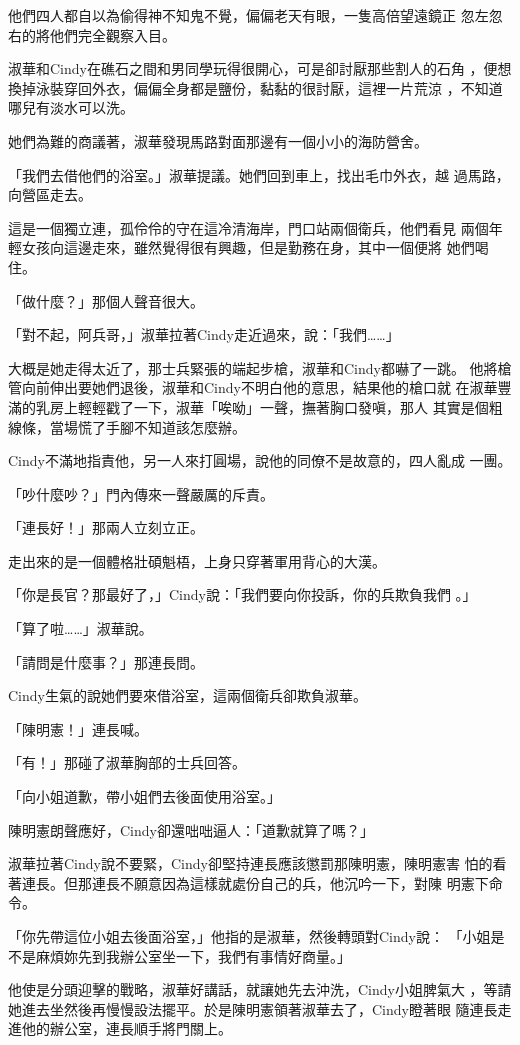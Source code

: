 他們四人都自以為偷得神不知鬼不覺，偏偏老天有眼，一隻高倍望遠鏡正
忽左忽右的將他們完全觀察入目。

淑華和Cindy在礁石之間和男同學玩得很開心，可是卻討厭那些割人的石角
，便想換掉泳裝穿回外衣，偏偏全身都是鹽份，黏黏的很討厭，這裡一片荒涼
，不知道哪兒有淡水可以洗。

她們為難的商議著，淑華發現馬路對面那邊有一個小小的海防營舍。

「我們去借他們的浴室。」淑華提議。她們回到車上，找出毛巾外衣，越
過馬路，向營區走去。

這是一個獨立連，孤伶伶的守在這冷清海岸，門口站兩個衛兵，他們看見
兩個年輕女孩向這邊走來，雖然覺得很有興趣，但是勤務在身，其中一個便將
她們喝住。

「做什麼？」那個人聲音很大。

「對不起，阿兵哥，」淑華拉著Cindy走近過來，說：「我們……」

大概是她走得太近了，那士兵緊張的端起步槍，淑華和Cindy都嚇了一跳。
他將槍管向前伸出要她們退後，淑華和Cindy不明白他的意思，結果他的槍口就
在淑華豐滿的乳房上輕輕戳了一下，淑華「唉呦」一聲，撫著胸口發嗔，那人
其實是個粗線條，當場慌了手腳不知道該怎麼辦。

Cindy不滿地指責他，另一人來打圓場，說他的同僚不是故意的，四人亂成
一團。

「吵什麼吵？」門內傳來一聲嚴厲的斥責。

「連長好！」那兩人立刻立正。

走出來的是一個體格壯碩魁梧，上身只穿著軍用背心的大漢。

「你是長官？那最好了，」Cindy說：「我們要向你投訴，你的兵欺負我們
。」

「算了啦……」淑華說。

「請問是什麼事？」那連長問。

Cindy生氣的說她們要來借浴室，這兩個衛兵卻欺負淑華。

「陳明憲！」連長喊。

「有！」那碰了淑華胸部的士兵回答。

「向小姐道歉，帶小姐們去後面使用浴室。」

陳明憲朗聲應好，Cindy卻還咄咄逼人：「道歉就算了嗎？」

淑華拉著Cindy說不要緊，Cindy卻堅持連長應該懲罰那陳明憲，陳明憲害
怕的看著連長。但那連長不願意因為這樣就處份自己的兵，他沉吟一下，對陳
明憲下命令。

「你先帶這位小姐去後面浴室，」他指的是淑華，然後轉頭對Cindy說：
「小姐是不是麻煩妳先到我辦公室坐一下，我們有事情好商量。」

他使是分頭迎擊的戰略，淑華好講話，就讓她先去沖洗，Cindy小姐脾氣大
，等請她進去坐然後再慢慢設法擺平。於是陳明憲領著淑華去了，Cindy瞪著眼
隨連長走進他的辦公室，連長順手將門關上。

